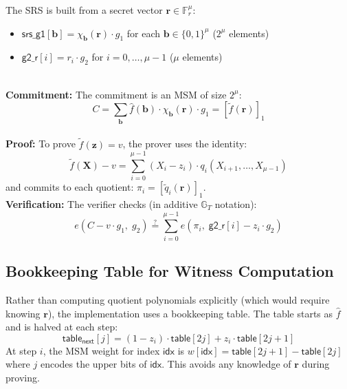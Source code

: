 The SRS is built from a secret vector $\mathbf{r} \in \mathbb{F}_r^\mu$:
\begin{itemize}
    \item $\mathsf{srs\_g1}[\mathbf{b}] = \chi_{\mathbf{b}}(\mathbf{r}) \cdot g_1$
          for each $\mathbf{b} \in \{0,1\}^\mu$ \quad ($2^\mu$ elements)
    \item $\mathsf{g2\_r}[i] = r_i \cdot g_2$ for $i = 0,\ldots,\mu-1$
          \quad ($\mu$ elements)
\end{itemize}
\\
\textbf{Commitment:}
The commitment is an MSM of size $2^\mu$:
\begin{equation}
    C = \sum_{\mathbf{b}} \hat{f}(\mathbf{b}) \cdot \chi_{\mathbf{b}}(\mathbf{r}) \cdot g_1
      = [\tilde{f}(\mathbf{r})]_1
\end{equation}
\\
\textbf{Proof:}
To prove $\tilde{f}(\mathbf{z}) = v$, the prover uses the identity:
\begin{equation}
    \tilde{f}(\mathbf{X}) - v
    = \sum_{i=0}^{\mu-1} (X_i - z_i) \cdot q_i(X_{i+1}, \ldots, X_{\mu-1})
\end{equation}
and commits to each quotient: $\pi_i = [\tilde{q}_i(\mathbf{r})]_1$.
\\
\textbf{Verification:}
The verifier checks (in additive $\mathbb{G}_T$ notation):
\begin{equation}
    e(C - v \cdot g_1,\; g_2)
    \stackrel{?}{=}
    \sum_{i=0}^{\mu-1} e\!\left(\pi_i,\; \mathsf{g2\_r}[i] - z_i \cdot g_2\right)
\end{equation}

\subsection{Bookkeeping Table for Witness Computation}

Rather than computing quotient polynomials explicitly (which would
require knowing $\mathbf{r}$), the implementation uses a bookkeeping
table. The table starts as $\hat{f}$ and is halved at each step:
\begin{equation}
    \mathsf{table}_{\mathsf{next}}[j]
    = (1 - z_i) \cdot \mathsf{table}[2j] + z_i \cdot \mathsf{table}[2j+1]
\end{equation}
At step $i$, the MSM weight for index $\mathsf{idx}$ is
$w[\mathsf{idx}] = \mathsf{table}[2j+1] - \mathsf{table}[2j]$
where $j$ encodes the upper bits of $\mathsf{idx}$. This avoids
any knowledge of $\mathbf{r}$ during proving.

